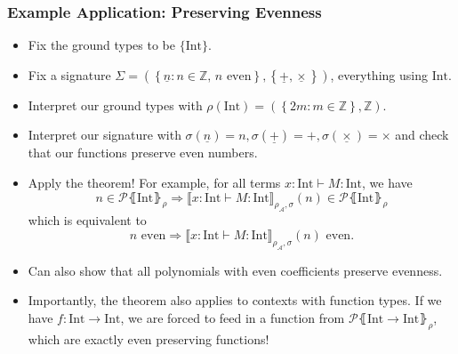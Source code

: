 \documentclass[aspectratio=169]{beamer}
\begin{document}
\begin{frame}
\frametitle{Example Application: Preserving Evenness}

\begin{itemize}
    \item Fix the ground types to be $\{\text{Int}\}$.
    \pause
    \item Fix a signature $\Sigma = \left(\left\{\underline{n} : n \in \mathbb{Z},\, n \text{ even}\right\}, \left\{\underline{+}, \underline{\times}\right\}\right)$, everything using $\text{Int}$.
    \pause
    \item Interpret our ground types with $\rho(\text{Int}) = \left(\left\{2m : m \in \mathbb{Z}\right\}, \mathbb{Z}\right)$.
    \pause
    \item Interpret our signature with $\sigma\left(\underline{n}\right) = n, \sigma\left(\underline{+}\right) = +, \sigma\left(\underline{\times}\right) = \times$ and check that our functions preserve even numbers.
    \pause
    \item Apply the theorem! For example, for all terms $x : \text{Int} \vdash M : \text{Int}$, we have
    \[
    n \in \mathcal{P}\lBrace \text{Int} \rBrace_\rho \Rightarrow \llbracket x : \text{Int} \vdash M : \text{Int} \rrbracket_{\rho_{\mathcal{A}}, \sigma}(n) \in \mathcal{P}\lBrace \text{Int} \rBrace_\rho
    \]
    which is equivalent to
    \[
    n \text{ even} \Rightarrow \llbracket x : \text{Int} \vdash M : \text{Int} \rrbracket_{\rho_{\mathcal{A}}, \sigma}(n) \text{ even}.
    \]
    \vspace{-12pt}
    \pause
    \item Can also show that all polynomials with even coefficients preserve evenness.
    \item Importantly, the theorem also applies to contexts with function types.
    If we have $f : \text{Int} \to \text{Int}$, we are forced to feed in a function from $\mathcal{P}\lBrace \text{Int} \to \text{Int} \rBrace_\rho$, which are exactly even preserving functions!
\end{itemize}

\end{frame}
\end{document}

